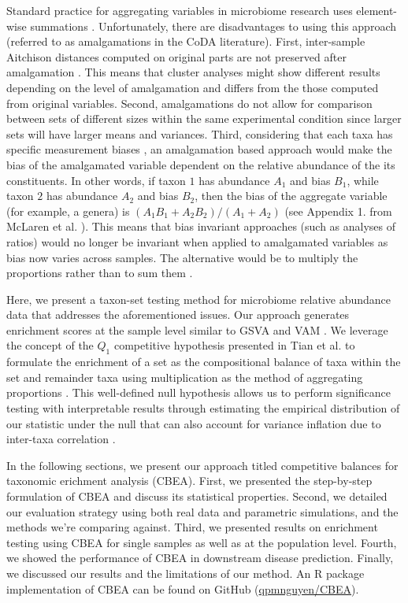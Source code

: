 \documentclass[10pt,letterpaper]{article}
\begin{document}
Standard practice for aggregating variables in microbiome research uses element-wise summations \cite{mclaren2019}. Unfortunately, there are disadvantages to using this approach (referred to as amalgamations in the CoDA literature). First, inter-sample Aitchison distances computed on original parts are not preserved after amalgamation \cite{egozcue2005}. This means that cluster analyses might show different results depending on the level of amalgamation and differs from the those computed from original variables. Second, amalgamations do not allow for comparison between sets of different sizes within the same experimental condition since larger sets will have larger means and variances. Third, considering that each taxa has specific measurement biases \cite{mclaren2019}, an amalgamation based approach would make the bias of the amalgamated variable dependent on the relative abundance of the its constituents. In other words, if taxon $1$ has abundance $A_1$ and bias $B_1$, while taxon $2$ has abundance $A_2$ and bias $B_2$, then the bias of the aggregate variable (for example, a genera) is $(A_1B_1 + A_2B_2)/(A_1 + A_2)$ (see Appendix 1. from McLaren et al. \cite{mclaren2019}). This means that bias invariant approaches (such as analyses of ratios) would no longer be invariant when applied to amalgamated variables as bias now varies across samples. The alternative would be to multiply the proportions rather than to sum them \cite{egozcue2005}. 

Here, we present a taxon-set testing method for microbiome relative abundance data that addresses the aforementioned issues. Our approach generates enrichment scores at the sample level similar to GSVA \cite{hanzelmann2013} and VAM \cite{frost2020}. We leverage the concept of the $Q_1$ competitive hypothesis presented in Tian et al. \cite{tian2005} to formulate the enrichment of a set as the compositional balance \cite{rivera-pinto2018} of taxa within the set and remainder taxa using multiplication as the method of aggregating proportions \cite{egozcue2005}. This well-defined null hypothesis allows us to perform significance testing with interpretable results through estimating the empirical distribution of our statistic under the null that can also account for variance inflation due to inter-taxa correlation \cite{wu2012}. 

In the following sections, we present our approach titled competitive balances for taxonomic erichment analysis (CBEA). First, we presented the step-by-step formulation of CBEA and discuss its statistical properties. Second, we detailed our evaluation strategy using both real data and parametric simulations, and the methods we're comparing against. Third, we presented results on enrichment testing using CBEA for single samples as well as at the population level. Fourth, we showed the performance of CBEA in downstream disease prediction. Finally, we discussed our results and the limitations of our method. An R package implementation of CBEA can be found on GitHub (\href{www.github.com/qpmnguyen/teaR}{qpmnguyen/CBEA}).
\end{document}
